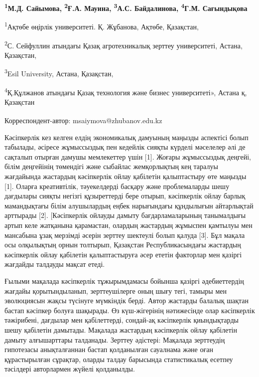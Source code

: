
\begin{articleheader}

{\bfseries \textsuperscript{1}М.Д. Сайымова\textsuperscript{\envelope },
\textsuperscript{2}Ғ.А. Мауина, \textsuperscript{3}А.С. Байдалинова,
\textsuperscript{4}Г.М. Сағындықова}
\end{articleheader}
\begin{affiliation}
\textsuperscript{1}Ақтөбе өңірлік университеті. Қ. Жұбанова, Ақтөбе,
Қазақстан,

\textsuperscript{2}С. Сейфуллин атындағы Қазақ агротехникалық зерттеу
университеті, Астана, Қазақстан,

\textsuperscript{3}Esil University, Астана, Қазақстан,

\textsuperscript{4}Қ.Құлжанов атындағы Қазақ технология және бизнес
университеті», Астана қ, Қазақстан

\raggedright {\bfseries \textsuperscript{\envelope }}Корреспондент-автор: msaiymova@zhubanov.edu.kz
\end{affiliation}

Кәсіпкерлік кез келген елдің экономикалық дамуының маңызды аспектісі
болып табылады, әсіресе жұмыссыздық пен кедейлік сияқты күрделі
мәселелер әлі де сақталып отырған дамушы мемлекеттер үшін {[}1{]}.
Жоғары жұмыссыздық деңгейі, білім деңгейінің төмендігі және сыбайлас
жемқорлықтың кең таралуы жағдайында жастардың кәсіпкерлік ойлау
қабілетін қалыптастыру өте маңызды {[}1{]}. Оларға креативтілік,
тәуекелдерді басқару және проблемаларды шешу дағдылары сияқты негізгі
құзыреттерді бере отырып, кәсіпкерлік ойлау барлық мамандықтағы білім
алушылардың еңбек нарығындағы құндылығын айтарлықтай арттырады {[}2{]}.
{[}Кәсіпкерлік ойлауды дамыту бағдарламаларының танымалдығы артып келе
жатқанына қарамастан, олардың жастардың жұмыспен қамтылуы мен мансабына
ұзақ мерзімді әсерін зерттеу шектеулі болып қалуда {[}3{]}. Бұл мақала
осы олқылықтың орнын толтырып, Қазақстан Республикасындағы жастардың
кәсіпкерлік ойлау қабілетін қалыптастыруға әсер ететін факторлар мен
қазіргі жағдайды талдауды мақсат етеді.

Ғылыми мақалада кәсіпкерлік тұжырымдамасы бойынша қазіргі әдебиеттердің
жағдайы қорытындыланып, зерттеушілерге оның шығу тегі, тамыры мен
эволюциясын жақсы түсінуге мүмкіндік берді. Автор жастарды балалық
шақтан бастап кәсіпкер болуға шақырады. Өз күш-жігерінің нәтижесінде
олар кәсіпкерлік тәжірибені, дағдылар мен қабілеттерді, сондай-ақ
кәсіпкерлік қиындықтарды шешу қабілетін дамытады. Мақалада жастардың
кәсіпкерлік ойлау қабілетін дамыту алғышарттары талданады. Зерттеу
әдістері: Мақалада зерттеудің гипотезасы анықталғаннан бастап
қолданылған сауалнама және оған құрастырылған сұрақтар, оларды талдау
барысында статистикалық есетпеу тәсілдері авторлармен жүйелі қолданылды.

